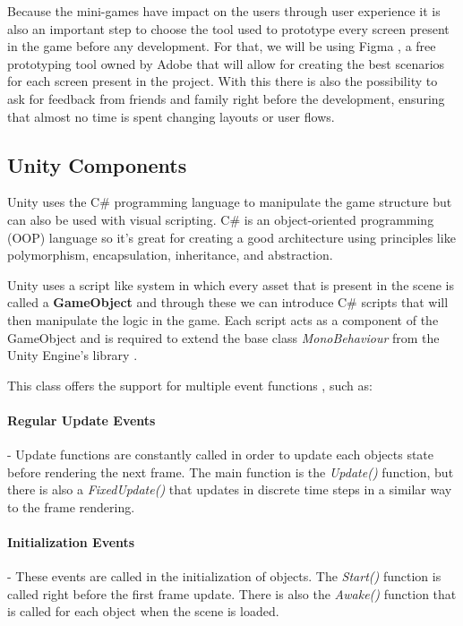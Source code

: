 Because the mini-games have impact on the users through user experience it is also an important step to choose the tool used to prototype every screen present in the game before any development. For that, we will be using Figma \cite{figma}, a free prototyping tool owned by Adobe that will allow for creating the best scenarios for each screen present in the project. With this there is also the possibility to ask for feedback from friends and family right before the development, ensuring that almost no time is spent changing layouts or user flows.

\newpage
\subsection{Unity Components}
Unity uses the C\# programming language to manipulate the game structure but can also be used with visual scripting. C\# is an object-oriented programming (OOP) language so it's great for creating a good architecture using principles like polymorphism, encapsulation, inheritance, and abstraction.

Unity uses a script like system in which every asset that is present in the scene is called a \textbf{GameObject} and through these we can introduce C\# scripts that will then manipulate the logic in the game. Each script acts as a component of the GameObject and is required to extend the base class \textit{MonoBehaviour} from the Unity Engine's library \cite{unityDocMonoBehaviour}.

This class offers the support for multiple event functions \cite{unityDocEvent}, such as:

\paragraph{Regular Update Events} - Update functions are constantly called in order to update each objects state before rendering the next frame. The main function is the \textit{Update()} function, but there is also a \textit{FixedUpdate()} that updates in discrete time steps in a similar way to the frame rendering.

\paragraph{Initialization Events} - These events are called in the initialization of objects. The \textit{Start()} function is called right before the first frame update. There is also the \textit{Awake()} function that is called for each object when the scene is loaded. 

